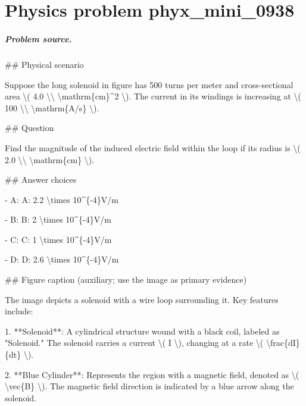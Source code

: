 
\chapter{Physics problem phyx\_mini\_0938}
\label{ch:PhyXMiniProblems_problem_phyx_mini_0938}

\paragraph{Problem source.}
\#\# Physical scenario

Suppose the long solenoid in figure has 500 turns per meter and cross-sectional area \textbackslash{}( 4.0 \textbackslash{}\textbackslash{} \textbackslash{}mathrm\{cm\}\textasciicircum{}2 \textbackslash{}). The current in its windings is increasing at \textbackslash{}( 100 \textbackslash{}\textbackslash{} \textbackslash{}mathrm\{A/s\} \textbackslash{}).

\#\# Question

Find the magnitude of the induced electric field within the loop if its radius is \textbackslash{}( 2.0 \textbackslash{}\textbackslash{} \textbackslash{}mathrm\{cm\} \textbackslash{}).

\#\# Answer choices

- A: A: 2.2 \textbackslash{}times 10\textasciicircum{}\{-4\}V/m

- B: B: 2 \textbackslash{}times 10\textasciicircum{}\{-4\}V/m

- C: C: 1 \textbackslash{}times 10\textasciicircum{}\{-4\}V/m

- D: D: 2.6 \textbackslash{}times 10\textasciicircum{}\{-4\}V/m

\#\# Figure caption (auxiliary; use the image as primary evidence)

The image depicts a solenoid with a wire loop surrounding it. Key features include:

1. **Solenoid**: A cylindrical structure wound with a black coil, labeled as "Solenoid." The solenoid carries a current \textbackslash{}( I \textbackslash{}), changing at a rate \textbackslash{}( \textbackslash{}frac\{dI\}\{dt\} \textbackslash{}).

2. **Blue Cylinder**: Represents the region with a magnetic field, denoted as \textbackslash{}( \textbackslash{}vec\{B\} \textbackslash{}). The magnetic field direction is indicated by a blue arrow along the solenoid.

